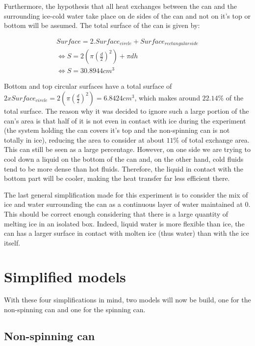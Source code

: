 \documentclass{report}
\begin{document}
	Furthermore, the hypothesis that all heat exchanges between the can and the surrounding ice-cold water take place on de sides of the can and not on it's top or bottom will be assumed. The total surface of the can is given by:
	
	\begin{equation}
	\begin{gathered}
		Surface= 2.Surface_{circle} + Surface_{rectangular side} \\
		\Leftrightarrow S= 2 (\pi  (\frac{d}{2})^2) + \pi dh \\
		\Leftrightarrow S= 30.8944 cm^3
	\end{gathered}
	\end{equation}
	
	Bottom and top circular surfaces have a total surface of $2xSurface_{circle}=2 (\pi  (\frac{d}{2})^2)= 6.8424 cm^3$, which makes around $22.14\% $ of the total surface. The reason why it was decided to ignore such a large portion of the can's area is that half of it is not even in contact with ice during the experiment (the system holding the can covers it's top and the non-spinning can is not totally in ice), reducing the area to consider at about $11\% $ of total exchange area. This can still be seen as a large percentage. However, on one side we are trying to cool down a liquid on the bottom of the can and, on the other hand, cold fluids tend to be more dense than hot fluids. Therefore, the liquid in contact with the bottom part will be cooler, making the heat transfer far less efficient there.
	
	The last general simplification made for this experiment is to consider the mix of ice and water surrounding the can as a continuous layer of water maintained at 0\textcelsius. This should be correct enough considering that there is a large quantity of melting ice in an isolated box. Indeed, liquid water is more flexible than ice, the can has a larger surface in contact with molten ice (thus water) than with the ice itself.
	
	
	\section{Simplified models}\label{sm}
	
	With these four simplifications in mind, two models will now be build, one for the non-spinning can and one for the spinning can.
	
	\subsection{Non-spinning can}\label{nsc}
	
\end{document}
